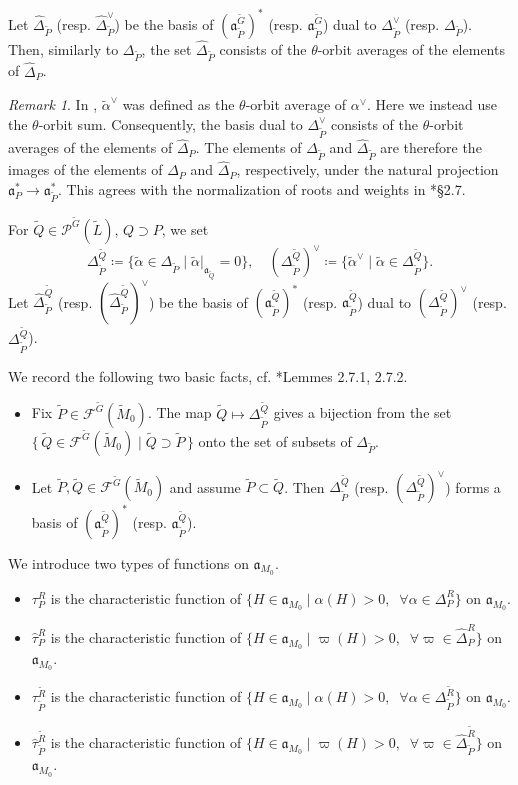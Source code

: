 \documentclass[12pt]{amsart}
\theoremstyle{definition}
\theoremstyle{plain}
\theoremstyle{remark}
\newtheorem{remark}[definition]{Remark}
\newcommand{\fa}{\mathfrak{a}}
\newcommand{\cF}{\mathcal{F}}
\newcommand{\cP}{\mathcal{P}}
\numberwithin{equation}{section}
\newcommand{\tG}{\widetilde{G}}
\newcommand{\tM}{\widetilde{M}}
\newcommand{\tL}{\widetilde{L}}
\newcommand{\tP}{\widetilde{P}}
\newcommand{\tQ}{\widetilde{Q}}
\newcommand{\tR}{\widetilde{R}}
\newcommand{\talpha}{\widetilde{\alpha}}
\begin{document}
Let $\widehat\Delta_{\tP}$ (resp. $\widehat\Delta_{\tP}^\vee$) be the basis of $(\fa_{\tP}^{\tG})^*$ (resp. $\fa_{\tP}^{\tG}$) dual to $\Delta_{\tP}^\vee$ (resp. $\Delta_{\tP}$). 
Then, similarly to $\Delta_{\tP}$, the set $\widehat\Delta_{\tP}$ consists of the $\theta$-orbit averages of the elements of $\widehat{\Delta}_P$.
\begin{remark}
In \cite{MW26}, $\widetilde\alpha^\vee$ was defined as the $\theta$-orbit average of $\alpha^\vee$.
Here we instead use the $\theta$-orbit sum. 
Consequently, the basis dual to $\Delta_{\tP}^\vee$ consists of the $\theta$-orbit averages of the elements
of $\widehat\Delta_P$. 
The elements of $\Delta_{\tP}$ and $\widehat\Delta_{\tP}$
are therefore the images of the elements of
$\Delta_P$ and $\widehat\Delta_P$, respectively,
under the natural projection $\fa_P^* \to\fa_{\tP}^*$.
This agrees with the normalization of roots and weights in \cite{LW13}*{\S2.7}.
\end{remark}



For $\tQ\in\cP^{\tG}(\tL)$, $Q\supset P$, we set
    \[
    \Delta_{\tP}^{\tQ}\coloneqq \{\talpha\in\Delta_{\tP} \mid \talpha|_{\fa_{\tQ}}=0 \}, \quad (\Delta_{\tP}^{\tQ})^\vee\coloneqq \{\talpha^\vee  \mid \talpha\in \Delta_{\tP}^{\tQ} \}.
    \]
Let $\widehat\Delta_{\tP}^{\tQ}$ (resp. $(\widehat\Delta_{\tP}^{\tQ})^\vee$) be the basis of
$(\fa_{\tP}^{\tQ})^*$ (resp. $\fa_{\tP}^{\tQ}$) dual to $(\Delta_{\tP}^{\tQ})^\vee$ (resp. $\Delta_{\tP}^{\tQ}$).

We record the following two basic facts, cf. \cite{LW13}*{Lemmes 2.7.1, 2.7.2}.
\begin{itemize}
    \item Fix $\tP \in \cF^{\tG}(\tM_0)$.
    The map $\tQ \longmapsto \Delta_{\tP}^{\tQ}$ gives a bijection from the set $\{\, \tQ \in \cF^{\tG}(\tM_0) \mid \tQ \supset \tP \,\}$ onto the set of subsets of $\Delta_{\tP}$.
    \item Let $\tP, \tQ \in \cF^{\tG}(\tM_0)$ and assume $\tP \subset \tQ$. Then $\Delta_{\tP}^{\tQ}$ (resp. $(\Delta_{\tP}^{\tQ})^\vee$) forms a basis of $(\fa_{\tP}^{\tQ})^*$ (resp. $\fa_{\tP}^{\tQ}$).
\end{itemize}


We introduce two types of functions on $\fa_{M_0}$.
\begin{itemize}
    \item $\tau_P^R$ is the characteristic function of $\{H\in\fa_{M_0}\mid  \alpha(H)>0, \;\; \forall \alpha\in\Delta_P^R\}$ on $\fa_{M_0}$.  
    \item $\widehat\tau_P^R$ is the characteristic function of $\{H\in\fa_{M_0}\mid  \varpi(H)>0, \;\; \forall \varpi\in\widehat\Delta_P^R\}$ on $\fa_{M_0}$.  
    \item $\tau_{\tP}^{\tR}$ is the characteristic function of $\{H\in\fa_{M_0}\mid  \alpha(H)>0, \;\; \forall \alpha\in\Delta_{\tP}^{\tR}\}$ on $\fa_{M_0}$.  
    \item $\widehat\tau_{\tP}^{\tR}$ is the characteristic function of $\{H\in\fa_{M_0}\mid  \varpi(H)>0, \;\; \forall \varpi\in\widehat\Delta_{\tP}^{\tR}\}$ on $\fa_{M_0}$.  
\end{itemize}
\end{document}
